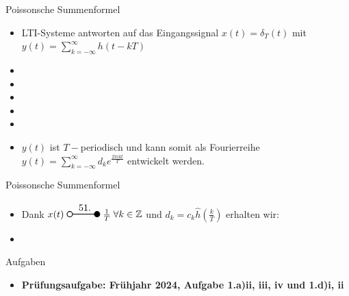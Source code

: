 \documentclass[14pt, aspectratio=169, handout]{beamer}
\newcommand{\transform}[2]{%
    \begin{tikzpicture}
        \draw[thick] (0,0) circle (0.1);
        \draw[thick] (0.1,0) -- (#2,0) node[midway, above] {#1};
        \filldraw[thick] (#2,0) circle (0.1);
    \end{tikzpicture}%
}
\begin{document}
\begin{frame}{Poissonsche Summenformel}
    \begin{itemize}
        \item LTI-Systeme antworten auf das Eingangssignal $x(t) = \delta_T(t)$ mit $y(t) = \displaystyle\sum_{k = -\infty}^\infty h(t-kT)$
        \item[] 
        \item[] 
        \item[] 
        \item[] 
        \item[] 
        \item $y(t)$ ist $T-$periodisch und kann somit als Fourierreihe $y(t) = \displaystyle\sum_{k = -\infty}^\infty d_k e^{\frac{2 \pi i k t}{T}}$ entwickelt werden.
    \end{itemize}
\end{frame}

\begin{frame}{Poissonsche Summenformel}
\begin{itemize}
    \item Dank $x(t) \; \transform{51.}{1} \; \frac{1}{T} \; \forall k \in \mathbb{Z}$  und $d_k = c_k \hat{h}\left(\frac{k}{T}\right)$ erhalten wir:
    \item[] 
\end{itemize} 
%
\end{frame}

\begin{frame}{Aufgaben}
    \begin{itemize}
        \item \textbf{Prüfungsaufgabe: Frühjahr 2024, Aufgabe 1.a)ii, iii, iv und 1.d)i, ii}
    \end{itemize}
\end{frame}
\end{document}
